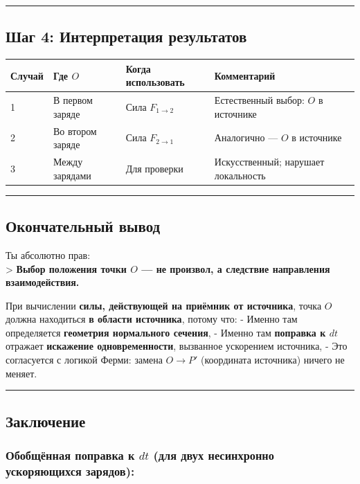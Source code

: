\documentclass[11pt]{article}
\begin{document}
\begin{center}\rule{0.5\linewidth}{\linethickness}\end{center}

\subsection{ Шаг 4: Интерпретация результатов}

\begin{longtable}[]{@{}llll@{}}
\toprule
Случай & Где \(O\) & Когда использовать & Комментарий\tabularnewline
\midrule
\endhead
1 & В первом заряде & Сила \(F_{1 \to 2}\) & Естественный выбор: \(O\) в
источнике\tabularnewline
2 & Во втором заряде & Сила \(F_{2 \to 1}\) & Аналогично --- \(O\) в
источнике\tabularnewline
3 & Между зарядами & Для проверки & Искусственный; нарушает
локальность\tabularnewline
\bottomrule
\end{longtable}

\begin{center}\rule{0.5\linewidth}{\linethickness}\end{center}

\subsection{Окончательный вывод}

Ты абсолютно прав:\\
\textgreater{} \textbf{Выбор положения точки \(O\) --- не произвол, а
следствие направления взаимодействия.}

При вычислении \textbf{силы, действующей на приёмник от источника},
точка \(O\) должна находиться \textbf{в области источника}, потому что:
- Именно там определяется \textbf{геометрия нормального сечения}, -
Именно там \textbf{поправка к \(dt\)} отражает \textbf{искажение
одновременности}, вызванное ускорением источника, - Это согласуется с
логикой Ферми: замена \(O \to P'\) (координата источника) ничего не
меняет.

\begin{center}\rule{0.5\linewidth}{\linethickness}\end{center}

\subsection{ Заключение}

\subsubsection{\texorpdfstring{Обобщённая поправка к \(dt\) (для двух
несинхронно ускоряющихся зарядов):}{Обобщённая поправка к dt (для двух несинхронно ускоряющихся зарядов):}}
\end{document}
